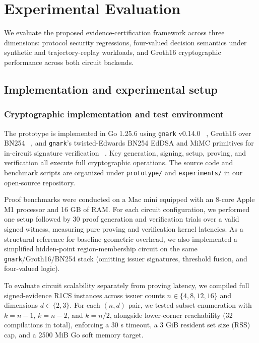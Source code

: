 \section{Experimental Evaluation}
We evaluate the proposed evidence-certification framework across three dimensions: protocol security regressions, four-valued decision semantics under synthetic and trajectory-replay workloads, and Groth16 cryptographic performance across both circuit backends.

\subsection{Implementation and experimental setup}
\subsubsection{Cryptographic implementation and test environment}
The prototype is implemented in Go 1.25.6 using \texttt{gnark} v0.14.0 ~\citep{gnark}, Groth16 over BN254 ~\citep{Groth2016}, and \texttt{gnark}'s twisted-Edwards BN254 EdDSA and MiMC primitives for in-circuit signature verification ~\citep{MiMC2016}. Key generation, signing, setup, proving, and verification all execute full cryptographic operations. The source code and benchmark scripts are organized under \texttt{prototype/} and \texttt{experiments/} in our open-source repository.

Proof benchmarks were conducted on a Mac mini equipped with an 8-core Apple M1 processor and 16 GB of RAM. For each circuit configuration, we performed one setup followed by 30 proof generation and verification trials over a valid signed witness, measuring pure proving and verification kernel latencies. As a structural reference for baseline geometric overhead, we also implemented a simplified hidden-point region-membership circuit on the same \texttt{gnark}/Groth16/BN254 stack (omitting issuer signatures, threshold fusion, and four-valued logic).

To evaluate circuit scalability separately from proving latency, we compiled full signed-evidence R1CS instances across issuer counts $n \in \{4, 8, 12, 16\}$ and dimensions $d \in \{2, 3\}$. For each $(n, d)$ pair, we tested subset enumeration with $k = n - 1$, $k = n - 2$, and $k = n/2$, alongside lower-corner reachability (32 compilations in total), enforcing a 30 s timeout, a 3 GiB resident set size (RSS) cap, and a 2500 MiB Go soft memory target.

